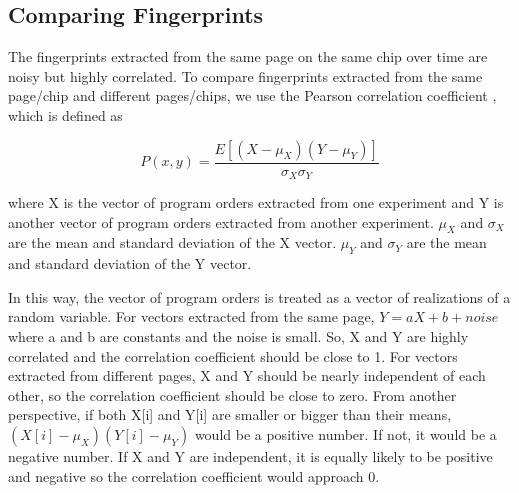 \subsection{Comparing Fingerprints}

The fingerprints extracted from the same page on the same chip over time are noisy but highly correlated. To compare fingerprints extracted from the same page/chip and different pages/chips, we use the Pearson correlation coefficient \cite{trust2011}, which is defined as

\begin{equation}
P(x,y)=\frac{E[(X-\mu_X)(Y-\mu_Y)]}{\sigma_X\sigma_Y}
\end{equation}

where X is the vector of program orders extracted from one experiment and Y is another vector of program orders extracted from another experiment. $\mu_X$ and $\sigma_X$ are the mean and standard deviation of the X vector. $\mu_Y$ and $\sigma_Y$ are the mean and standard deviation of the Y vector. 

In this way, the vector of program orders is treated as a vector of realizations of a random variable. For vectors extracted from the same page, $Y=aX+b+noise$ where a and b are constants and the noise is small. So, X and Y are highly correlated and the correlation coefficient should be close to 1. For vectors extracted from different pages, X and Y should be nearly independent of each other, so the correlation coefficient should be close to zero. From another perspective, if both X[i] and Y[i] are smaller or bigger than their means, $(X[i]-\mu_X)(Y[i]-\mu_Y)$ would be a positive number. If not, it would be a negative number. If X and Y are independent, it is equally likely to be positive and negative so the correlation coefficient would approach 0.

